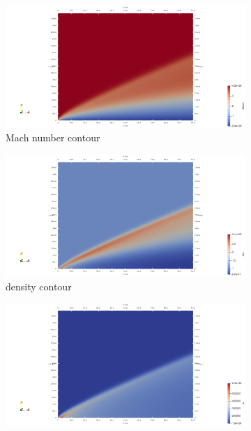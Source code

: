 \documentclass[conf]{new-aiaa}
\begin{document}
\begin{figure}[!htb]
    \centering
    \begin{subfigure}{0.45\textwidth}
        \includegraphics[width=\textwidth]{supportingFiles/solution_files_flatplate_adiabaticWall/mach.png}
        \caption{Mach number contour}
    \end{subfigure}
    \hfill
    \begin{subfigure}{0.45\textwidth}
        \includegraphics[width=\textwidth]{supportingFiles/solution_files_flatplate_adiabaticWall/density.png}
        \caption{density contour}
    \end{subfigure}
    \hfill
    \begin{subfigure}{0.45\textwidth}
        \includegraphics[width=\textwidth]{supportingFiles/solution_files_flatplate_adiabaticWall/pressure.png}

\end{subfigure}
\end{figure}
\end{document}
